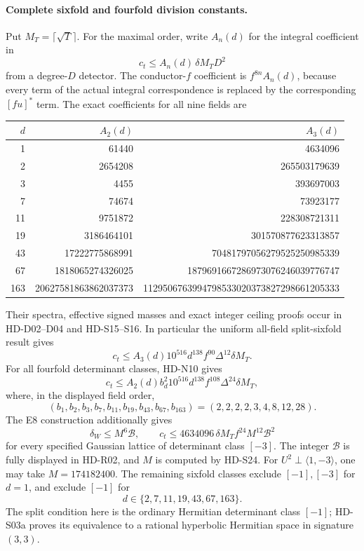 \paragraph{Complete sixfold and fourfold division constants.}
Put $M_T=\lceil\sqrt T\rceil$. For the maximal order, write $A_n(d)$
for the integral coefficient in
\[
 c_t\le A_n(d)\,\delta M_T D^2
\]
from a degree-$D$ detector. The conductor-$f$ coefficient is
$f^{8n}A_n(d)$, because every term of the actual integral
correspondence is replaced by the corresponding $[fu]^*$ term.
The exact coefficients for all nine fields are
\begin{center}
\small
\begin{tabular}{r|r|r}
\toprule
$d$ & $A_2(d)$ & $A_3(d)$\\
\midrule
1&61440&4634096\\
2&2654208&265503179639\\
3&4455&393697003\\
7&74674&73923177\\
11&9751872&228308721311\\
19&3186464101&301570877623313857\\
43&17222775868991&70481797056279525250985339\\
67&1818065274326025&1879691667286973076246039776747\\
163&20627581863862037373&1129506763994798533020373827298661205333\\
\bottomrule
\end{tabular}
\end{center}
Their spectra, effective signed masses and exact integer ceiling
proofs occur in HD-D02--D04 and HD-S15--S16. In particular the
uniform all-field split-sixfold result gives
\[
 \boxed{c_t\le A_3(d)10^{516}d^{138}f^{90}\Delta^{12}
                    \delta M_T.}
\]
For all fourfold determinant classes, HD-N10 gives
\[
 \boxed{c_t\le A_2(d)b_d^2 10^{516}d^{138}f^{108}\Delta^{24}
                    \delta M_T,}
\]
where, in the displayed field order,
\[
 (b_1,b_2,b_3,b_7,b_{11},b_{19},b_{43},b_{67},b_{163})
 =(2,2,2,2,3,4,8,12,28).
\]
The E8 construction additionally gives
\[
 \boxed{\delta_W\le M^6\mathcal B,\qquad
 c_t\le4634096\,\delta M_T f^{24}M^{12}\mathcal B^2}
\]
for every specified Gaussian lattice of determinant class $[-3]$.
The integer $\mathcal B$ is fully displayed in HD-R02, and $M$ is
computed by HD-S24. For $U^2\perp\langle1,-3\rangle$, one may take
$M=174182400$. The remaining sixfold classes exclude $[-1],[-3]$
for $d=1$, and exclude $[-1]$ for
\[d\in\{2,7,11,19,43,67,163\}.\]
The split condition here is the
ordinary Hermitian determinant class $[-1]$; HD-S03a proves its
equivalence to a rational hyperbolic Hermitian space in signature
$(3,3)$.

